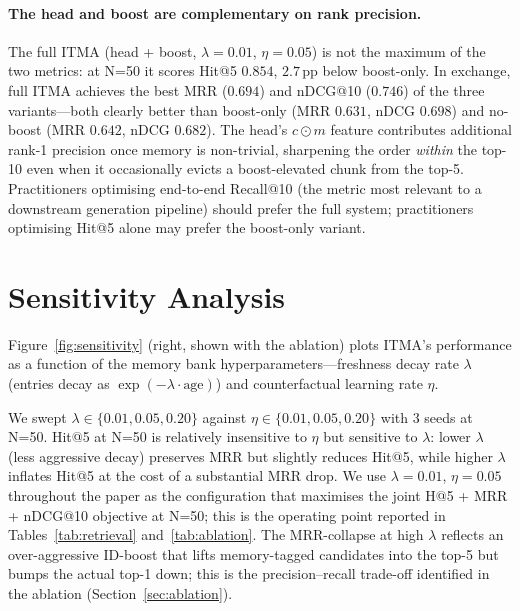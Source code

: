 \documentclass[preprint,12pt]{elsarticle}
\begin{document}
\paragraph{The head and boost are complementary on rank precision.}
The full ITMA (head + boost, $\lambda{=}0.01$, $\eta{=}0.05$) is not the
maximum of the two metrics: at N=50 it scores Hit@5 $0.854$, $2.7$\,pp below
boost-only.  In exchange, full ITMA achieves the best MRR ($0.694$) and
nDCG@10 ($0.746$) of the three variants---both clearly better than
boost-only (MRR $0.631$, nDCG $0.698$) and no-boost (MRR $0.642$, nDCG
$0.682$).  The head's $c{\odot}m$ feature contributes additional rank-1
precision once memory is non-trivial, sharpening the order \emph{within} the
top-10 even when it occasionally evicts a boost-elevated chunk from the
top-5.  Practitioners optimising end-to-end Recall@10 (the metric most
relevant to a downstream generation pipeline) should prefer the full system;
practitioners optimising Hit@5 alone may prefer the boost-only variant.

\section{Sensitivity Analysis}
\label{sec:sensitivity}

Figure~\ref{fig:sensitivity} (right, shown with the ablation) plots ITMA's
performance as a function of the memory bank hyperparameters---freshness
decay rate $\lambda$ (entries decay as
$\exp(-\lambda \cdot \text{age})$) and counterfactual learning rate $\eta$.

We swept $\lambda \in \{0.01, 0.05, 0.20\}$ against
$\eta \in \{0.01, 0.05, 0.20\}$ with 3 seeds at N=50.  Hit@5 at N=50 is
relatively insensitive to $\eta$ but sensitive to $\lambda$: lower
$\lambda$ (less aggressive decay) preserves MRR but slightly reduces Hit@5,
while higher $\lambda$ inflates Hit@5 at the cost of a substantial MRR
drop.  We use $\lambda=0.01$, $\eta=0.05$ throughout the paper as the
configuration that maximises the joint H@5 + MRR + nDCG@10 objective at
N=50; this is the operating point reported in Tables~\ref{tab:retrieval}
and~\ref{tab:ablation}.  The MRR-collapse at high $\lambda$ reflects an
over-aggressive ID-boost that lifts memory-tagged candidates into the top-5
but bumps the actual top-1 down; this is the precision--recall trade-off
identified in the ablation (Section~\ref{sec:ablation}).

\end{document}
